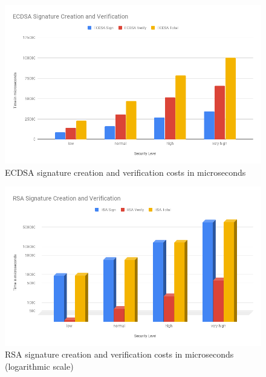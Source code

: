 				  \begin{figure}
					\centering
					\includegraphics[width=1.0\textwidth]{img/papi-ecdsa-sign-verify.png}
					\centering \caption{ECDSA signature creation and verification costs in microseconds}
					\label{af:3}
				  \end{figure}
  
				  \begin{figure}
					\centering
					\includegraphics[width=1.0\textwidth]{img/papi-rsa-sign-verify.png}
					\centering \caption{RSA signature creation and verification costs in microseconds (logarithmic scale)}
					\label{af:4}
				  \end{figure}
  
